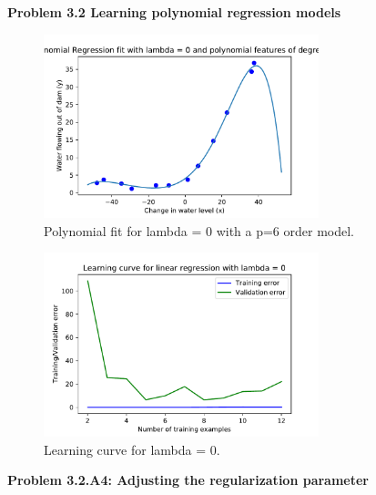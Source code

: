 \documentclass[]{book}
\theoremstyle{definition}
\begin{document}
\textbf{Problem 3.2 Learning polynomial regression models}
\begin{figure}[H]
	\centering
	\includegraphics[width=8cm]{fig9.pdf}
	\caption{Polynomial fit for lambda = 0 with a p=6 order model.}
	\label{fig:9}
\end{figure}
\begin{figure}[H]
	\centering
	\includegraphics[width=8cm]{fig10.pdf}
	\caption{Learning curve for lambda = 0.}
	\label{fig:10}
\end{figure}
\textbf{Problem 3.2.A4: Adjusting the regularization parameter}
\end{document}
